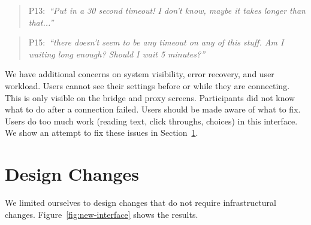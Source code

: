 \documentclass[USenglish,oneside,twocolumn]{article}
\newcommand{\pquote}[2]{
\begin{quotation}
\noindent #1:~\textit{#2}
\end{quotation}
}
\begin{document}
\pquote{P13}{``Put in a 30 second timeout! I don't know, maybe it takes longer than that...''}

\pquote{P15}{``there doesn't seem to be any timeout on any of this stuff. Am I waiting long enough? Should I wait 5 minutes?''}

We have additional concerns on system visibility, error recovery, and user workload. Users cannot see their settings before or while they are connecting. This is only visible on the bridge and proxy screens. Participants did not know what to do after a connection failed. Users should be made aware of what to fix. Users do too much work (reading text, click throughs, choices) in this interface. We show an attempt to fix these issues in Section~\ref{sec:design}. 

\section{Design Changes}
\label{sec:design} 

We limited ourselves to design changes that do not require infrastructural changes. Figure~\ref{fig:new-interface} shows the results. 
\end{document}
